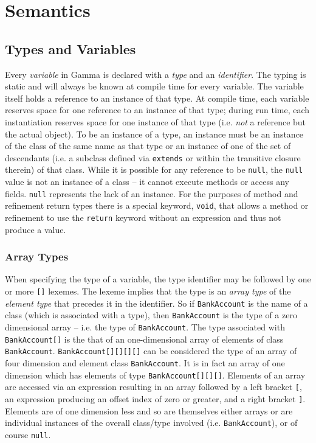 \section{Semantics}

\subsection{Types and Variables}
Every \textit{variable} in Gamma is declared with a \textit{type} and an \textit{identifier}. The typing is static and will always be known at compile time for every variable. The variable itself holds a reference to an instance of that type. At compile time, each variable reserves space for one reference to an instance of that type; during run time, each instantiation reserves space for one instance of that type (i.e. \emph{not} a reference but the actual object). To be an instance of a type, an instance must be an instance of the class of the same name as that type or an instance of one of the set of descendants (i.e. a subclass defined via \verb!extends! or within the transitive closure therein) of that class. While it is possible for any reference to be \verb!null!, the \verb!null! value is not an instance of a class -- it cannot execute methods or access any fields. \verb!null! represents the lack of an instance. For the purposes of method and refinement return types there is a special keyword, \verb!void!, that allows a method or refinement to use the \verb!return! keyword without an expression and thus not produce a value.

\subsubsection{Array Types}
When specifying the type of a variable, the type identifier may be followed by one or more \verb![]! lexemes. The lexeme implies that the type is an \textit{array type} of the \textit{element type} that precedes it in the identifier. So if \verb!BankAccount! is the name of a class (which is associated with a type), then \verb!BankAccount! is the type of a zero dimensional array -- i.e. the type of \verb!BankAccount!. The type associated with \verb!BankAccount[]! is the that of an one-dimensional array of elements of class \verb!BankAccount!. \verb!BankAccount[][][][]! can be considered the type of an array of four dimension and element class \verb!BankAccount!. It is in fact an array of one dimension which has elements of type \verb!BankAccount[][][]!. Elements of an array are accessed via an expression resulting in an array followed by a left bracket \verb![!, an expression producing an offset index of zero or greater, and a right bracket \verb!]!. Elements are of one dimension less and so are themselves either arrays or are individual instances of the overall class/type involved (i.e. \verb!BankAccount!), or of course \verb!null!.

